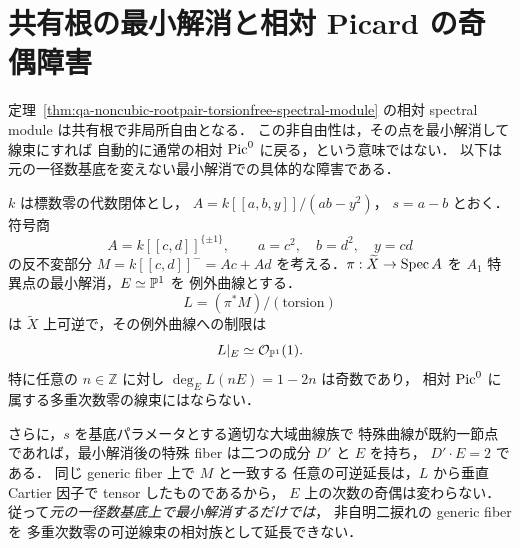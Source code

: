 \section{共有根の最小解消と相対 Picard の奇偶障害}
\label{sec:qa-nodal-resolution-parity}

定理~\ref{thm:qa-noncubic-rootpair-torsionfree-spectral-module}
の相対 spectral module は共有根で非局所自由となる．
この非自由性は，その点を最小解消して線束にすれば
自動的に通常の相対 $\operatorname{Pic}^0$ に戻る，という意味ではない．
以下は元の一径数基底を変えない最小解消での具体的な障害である．

\begin{proposition}[最小解消後にも残る奇数次数]
\label{prop:qa-nodal-resolution-odd-exceptional-degree}
$k$ は標数零の代数閉体とし，
$A=k[[a,b,y]]/(ab-y^2)$，
$s=a-b$ とおく．
符号商
\[
 A=k[[c,d]]^{\{\pm1\}},\qquad
 a=c^2,\quad b=d^2,\quad y=cd
\]
の反不変部分
$M=k[[c,d]]^- =Ac+Ad$
を考える．$\pi:\widetilde X\to\operatorname{Spec} A$ を
$A_1$ 特異点の最小解消，$E\simeq\mathbb P^1$ を
例外曲線とする．
\[
 L=(\pi^*M)/(\text{torsion})
\]
は $\widetilde X$ 上可逆で，その例外曲線への制限は
\[
                    L|_E\simeq\mathcal O_{\mathbb P^1}(1).
\]
特に任意の $n\in\mathbb Z$ に対し
$\deg_E L(nE)=1-2n$ は奇数であり，
相対 $\operatorname{Pic}^0$ に属する多重次数零の線束にはならない．

さらに，$s$ を基底パラメータとする適切な大域曲線族で
特殊曲線が既約一節点であれば，最小解消後の特殊
fiber は二つの成分 $D'$ と $E$ を持ち，
$D'\cdot E=2$ である．
同じ generic fiber 上で $M$ と一致する
任意の可逆延長は，$L$ から垂直 Cartier 因子で
tensor したものであるから，
$E$ 上の次数の奇偶は変わらない．
従って\emph{元の一径数基底上で最小解消するだけでは}，
非自明二捩れの generic fiber を
多重次数零の可逆線束の相対族として延長できない．
\end{proposition}
